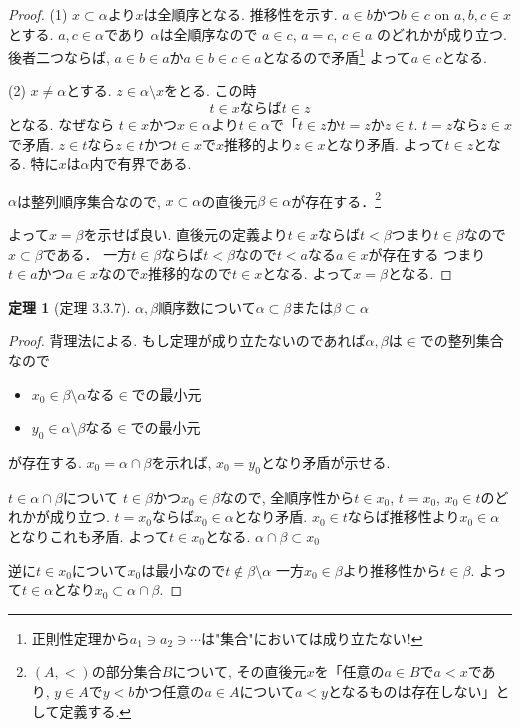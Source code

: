 \documentclass[dvipdfmx,a4paper,11pt]{report}
\theoremstyle{definition}
\newtheorem{thm}{定理}
\begin{document}
\begin{proof}
(1) $x \subset \alpha$より$x$は全順序となる. 推移性を示す.
$a \in b$かつ$b \in c$ on $a,b,c \in x$とする. 
$a,c \in \alpha$であり
$\alpha$は全順序なので
$a \in c$, $a = c$, $c \in a$
のどれかが成り立つ.
後者二つならば, $a \in b \in a$か$a \in b \in c \in a$となるので矛盾\footnote{正則性定理から$a_1 \ni a_2 \ni \cdots$は"集合"においては成り立たない!}
よって$a \in c$となる. 

(2) $x \neq \alpha$とする.
$z \in \alpha \setminus x$をとる.
この時
$$
t \in x \text{ならば} t \in z
$$
となる. なぜなら
$t \in x$かつ$x \in \alpha$より$t \in \alpha$で「$t\in z$か$t=z$か$z \in t$.
$t=z$なら$z \in x$で矛盾.
$z\in t$なら$z \in t$かつ$t \in x$で$x$推移的より$z \in x$となり矛盾.
よって$t \in z$となる.
特に$x$は$\alpha$内で有界である.

$\alpha$は整列順序集合なので, $x \subset \alpha$の直後元$\beta \in \alpha$が存在する．\footnote{$(A,<)$の部分集合$B$について, その直後元$x$を「任意の$a \in B$で$a < x$であり, $y \in A$で$y <b$かつ任意の$a \in A$について$a <y$となるものは存在しない」として定義する.}

よって$x = \beta$を示せば良い.
直後元の定義より$t \in x$ならば$t<\beta$つまり$t\in \beta$なので$x \subset \beta$である．
一方$t \in \beta$ならば$t < \beta$なので$t < a$なる$a \in x$が存在する
つまり$t \in a$かつ$a \in x$なので$x$推移的なので$t \in x$となる. よって$x  = \beta$となる.

\end{proof}

 \begin{tcolorbox}
 [colback = white, colframe = green!35!black, fonttitle = \bfseries,breakable = true]
\begin{thm}[定理 3.3.7]
\label{thm-tanaka-3.3.7}
$\alpha, \beta$順序数について$\alpha \subset \beta$または$\beta \subset \alpha$
\end{thm}
\end{tcolorbox}

\begin{proof}
背理法による. 
もし定理が成り立たないのであれば$\alpha, \beta$は$\in$での整列集合なので
\begin{itemize}
\item $x_0 \in \beta \setminus \alpha$なる$\in$での最小元
\item $y_0 \in  \alpha \setminus \beta$なる$\in$での最小元
\end{itemize}
が存在する.
$x_0 = \alpha \cap \beta$を示れば, $x_0=y_0$となり矛盾が示せる.

$t \in \alpha \cap \beta$について
$t \in \beta$かつ$x_0 \in \beta$なので, 全順序性から$t \in x_0$, $t =x_0$, $x_0 \in t$のどれかが成り立つ. 
$t =x_0$ならば$x_0 \in \alpha$となり矛盾. $x_0 \in t$ならば推移性より$x_0 \in \alpha$となりこれも矛盾. よって$t \in x_0$となる. $\alpha \cap \beta \subset x_0$

逆に$t \in x_0$について$x_0$は最小なので$t \not \in \beta \setminus \alpha$
一方$x_0 \in \beta$より推移性から$t \in \beta$. よって$t \in \alpha$となり$x_0 \subset \alpha \cap \beta$.
\end{proof}
\end{document}
